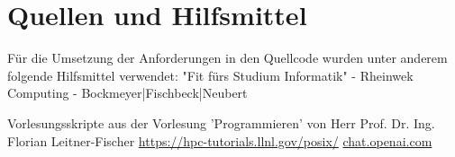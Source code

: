 \chapter{Quellen und Hilfsmittel}
\label{cha:quellen}
Für die Umsetzung der Anforderungen in den Quellcode wurden unter anderem folgende Hilfsmittel verwendet:
"Fit fürs Studium Informatik" - 
Rheinwek Computing - Bockmeyer|Fischbeck|Neubert

Vorlesungsskripte aus der Vorlesung 'Programmieren' von Herr Prof. Dr. Ing. Florian Leitner-Fischer\newline\newline
\url{https://hpc-tutorials.llnl.gov/posix/}\newline\newline
\url{chat.openai.com}
